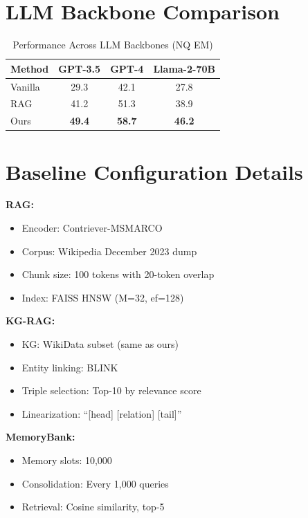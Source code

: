 \documentclass[conference]{IEEEtran}
\begin{document}
\section{LLM Backbone Comparison}
\label{app:backbone_comparison}

\begin{table}[h]
\centering
\caption{Performance Across LLM Backbones (NQ EM)}
\begin{tabular}{lccc}
\toprule
\textbf{Method} & \textbf{GPT-3.5} & \textbf{GPT-4} & \textbf{Llama-2-70B} \\
\midrule
Vanilla & 29.3 & 42.1 & 27.8 \\
RAG & 41.2 & 51.3 & 38.9 \\
Ours & \textbf{49.4} & \textbf{58.7} & \textbf{46.2} \\
\bottomrule
\end{tabular}
\end{table}

\section{Baseline Configuration Details}
\label{app:baselines}

\textbf{RAG:}
\begin{itemize}
    \item Encoder: Contriever-MSMARCO
    \item Corpus: Wikipedia December 2023 dump
    \item Chunk size: 100 tokens with 20-token overlap
    \item Index: FAISS HNSW (M=32, ef=128)
\end{itemize}

\textbf{KG-RAG:}
\begin{itemize}
    \item KG: WikiData subset (same as ours)
    \item Entity linking: BLINK
    \item Triple selection: Top-10 by relevance score
    \item Linearization: ``[head] [relation] [tail]''
\end{itemize}

\textbf{MemoryBank:}
\begin{itemize}
    \item Memory slots: 10,000
    \item Consolidation: Every 1,000 queries
    \item Retrieval: Cosine similarity, top-5
\end{itemize}
\end{document}
